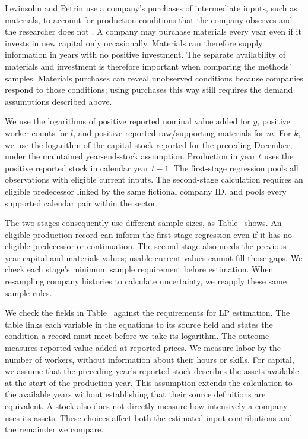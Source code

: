 Levinsohn and Petrin use a company's purchases of intermediate inputs, such as materials, to account for production conditions that the company observes and the researcher does not \citep{lp}. A company may purchase materials every year even if it invests in new capital only occasionally. Materials can therefore supply information in years with no positive investment. The separate availability of materials and investment is therefore important when comparing the methods' samples. Materials purchases can reveal unobserved conditions because companies respond to those conditions; using purchases this way still requires the demand assumptions described above.

We use the logarithms of positive reported nominal value added for $y$, positive worker counts for $l$, and positive reported raw/supporting materials for $m$. For $k$, we use the logarithm of the capital stock reported for the preceding December, under the maintained year-end-stock assumption. Production in year $t$ uses the positive reported stock in calendar year $t-1$. The first-stage regression pools all observations with eligible current inputs. The second-stage calculation requires an eligible predecessor linked by the same fictional company ID, and pools every supported calendar pair within the sector.

The two stages consequently use different sample sizes, as Table~ shows. An eligible production record can inform the first-stage regression even if it has no eligible predecessor or continuation. The second stage also needs the previous-year capital and materials values; usable current values cannot fill those gaps. We check each stage's minimum sample requirement before estimation. When resampling company histories to calculate uncertainty, we reapply these same sample rules.

We check the fields in Table~ against the requirements for LP estimation. The table links each variable in the equations to its source field and states the condition a record must meet before we take its logarithm.
The outcome measures reported value added at reported prices. We measure labor by the number of workers, without information about their hours or skills. For capital, we assume that the preceding year's reported stock describes the assets available at the start of the production year. This assumption extends the calculation to the available years without establishing that their source definitions are equivalent. A stock also does not directly measure how intensively a company uses its assets. These choices affect both the estimated input contributions and the remainder we compare.

